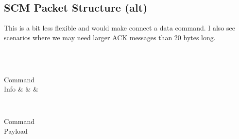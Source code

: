 \documentclass[10pt]{article}
\begin{document}
	\subsection{SCM Packet Structure (alt)} \mbox{}
	This is a bit less flexible and would make connect a data command. I also see scenarios where we may need larger ACK messages than 20 bytes long. \\
	\\
	\begin{bytefield}[bitwidth=1.1em]{32}
	  \\
	 \begin{rightwordgroup}{Command \\
	   Info}
	 &
	&
	 &
	 \end{rightwordgroup}
	 \\
	 \begin{rightwordgroup}{Command \\
	   Payload}
	   \\
	 \end{rightwordgroup}
	\end{bytefield}
\end{document}

